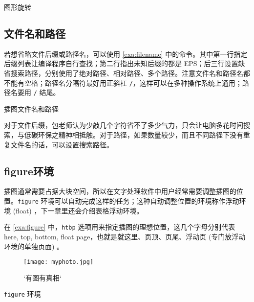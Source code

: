 \begin{example}[htbp]
\caption{图形旋转}
\label{exa:graph_rotate}
\end{example}

\subsection{文件名和路径}

若想省略文件后缀或路径名，可以使用 \autoref{exa:filename} 中的命令。其中第一行指定后缀列表让编译程序自行查找；第二行指出未知后缀的都是 EPS；后三行设置缺省搜索路径，分别使用了绝对路径、相对路径、多个路径。注意文件名和路径名都不能有空格；路径名分隔符最好用正斜杠 \verb|/|，这样可以在多种操作系统上通用；路径名要用 \verb|/| 结尾。

\begin{example}[h]
\begin{Code}[numbers=left]
\graphicspath{{c:/secret-garden/}}
\graphicspath{{./img/}}
\graphicspath{{one-little/}{two-little/}{three-little-indians/}}
\end{Code}
\caption{插图文件名和路径}
\label{exa:filename}
\end{example}

对于文件后缀，包老师认为少敲几个字符省不了多少气力，只会让电脑多花时间搜索，与低碳环保之精神相抵触。对于路径，如果数量较少，而且不同路径下没有重复文件名的话，可以设置搜索路径。

\subsection{figure环境}

插图通常需要占据大块空间，所以在文字处理软件中用户经常需要调整插图的位置。\texttt{figure} 环境可以自动完成这样的任务；这种自动调整位置的环境称作浮动环境 (float) ，下一章里还会介绍表格浮动环境。

在 \autoref{exa:figure} 中，\texttt{htbp} 选项用来指定插图的理想位置，这几个字母分别代表 here, top, bottom, float page，也就是就这里、页顶、页尾、浮动页 (专门放浮动环境的单独页面) 。

\begin{example}[h]
\begin{Code}[numbers=left]
\begin{figure}[htbp]
\centering
\texttt{[image: myphoto.jpg]}
\caption{`有图有真相`}
\label{fig:myphoto}
\end{figure}
\end{Code}
\caption{\texttt{figure} 环境}
\label{exa:figure}
\end{example}

